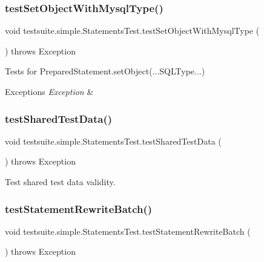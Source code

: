 \subsubsection{\texorpdfstring{test\+Set\+Object\+With\+Mysql\+Type()}{testSetObjectWithMysqlType()}}
{\footnotesize\ttfamily void testsuite.\+simple.\+Statements\+Test.\+test\+Set\+Object\+With\+Mysql\+Type (\begin{DoxyParamCaption}{ }\end{DoxyParamCaption}) throws Exception}

Tests for Prepared\+Statement.\+set\+Object(...S\+Q\+L\+Type...)


\begin{DoxyExceptions}{Exceptions}
{\em Exception} & \\
\hline
\end{DoxyExceptions}
\mbox{\label{classtestsuite_1_1simple_1_1_statements_test_affafb967129c6b038a22a6fd14f36517}} 
\subsubsection{\texorpdfstring{test\+Shared\+Test\+Data()}{testSharedTestData()}}
{\footnotesize\ttfamily void testsuite.\+simple.\+Statements\+Test.\+test\+Shared\+Test\+Data (\begin{DoxyParamCaption}{ }\end{DoxyParamCaption}) throws Exception}

Test shared test data validity. \mbox{\label{classtestsuite_1_1simple_1_1_statements_test_a30f552176c9ad0cd34ab51a8b90ab0ee}} 
\subsubsection{\texorpdfstring{test\+Statement\+Rewrite\+Batch()}{testStatementRewriteBatch()}}
{\footnotesize\ttfamily void testsuite.\+simple.\+Statements\+Test.\+test\+Statement\+Rewrite\+Batch (\begin{DoxyParamCaption}{ }\end{DoxyParamCaption}) throws Exception}

